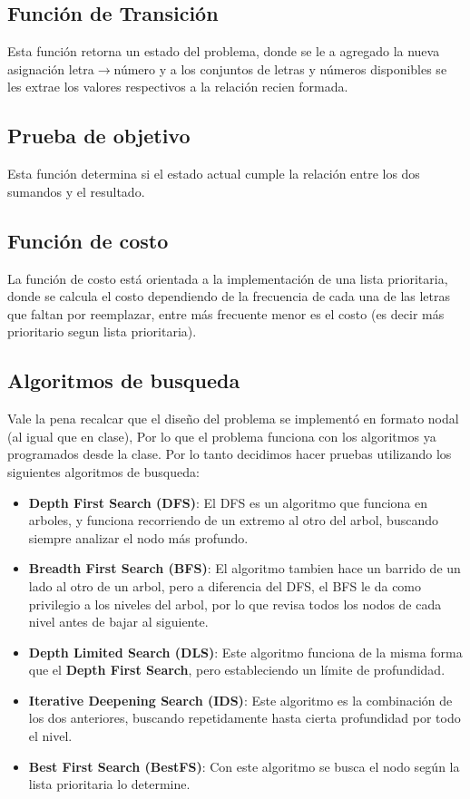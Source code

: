 \documentclass[11pt]{article}
\begin{document}
\subsection{Función de Transición}
\label{sec:org71c8565}

Esta función retorna un estado del problema, donde se le a agregado la nueva
asignación letra\(\to\)número y a los conjuntos de letras y números disponibles
se les extrae los valores respectivos a la relación recien formada.

\subsection{Prueba de objetivo}
\label{sec:org6d32b3d}

Esta función determina si el estado actual cumple la relación entre los dos sumandos y el resultado.

\subsection{Función de costo}
\label{sec:org3649eee}

La función de costo está orientada a la implementación de una lista prioritaria,
donde se calcula el costo dependiendo de la frecuencia de cada una de las letras
que faltan por reemplazar, entre más frecuente menor es el costo (es decir más
prioritario segun lista prioritaria).

\subsection{Algoritmos de busqueda}
\label{sec:orgac3bfc5}

Vale la pena recalcar que el diseño del problema se implementó en formato nodal
(al igual que en clase), Por lo que el problema funciona con los algoritmos ya
programados desde la clase. Por lo tanto decidimos hacer pruebas utilizando los
siguientes algoritmos de busqueda:

\begin{itemize}
\item \textbf{\textbf{Depth First Search (DFS)}}: El DFS es un algoritmo que funciona en arboles, y funciona recorriendo de un extremo al otro del arbol, buscando siempre analizar el nodo más profundo.
\item \textbf{\textbf{Breadth First Search (BFS)}}: El algoritmo tambien hace un barrido de un lado al otro de un arbol, pero a diferencia del DFS, el BFS le da como privilegio a los niveles del arbol, por lo que revisa todos los nodos de cada nivel antes de bajar al siguiente.
\item \textbf{\textbf{Depth Limited Search (DLS)}}: Este algoritmo funciona de la misma forma que el \textbf{Depth First Search}, pero estableciendo un límite de profundidad.
\item \textbf{\textbf{Iterative Deepening Search (IDS)}}: Este algoritmo es la combinación de los dos anteriores, buscando repetidamente hasta cierta profundidad por todo el nivel.
\item \textbf{\textbf{Best First Search (BestFS)}}: Con este algoritmo se busca el nodo según la lista prioritaria lo determine.
\end{itemize}
\end{document}
